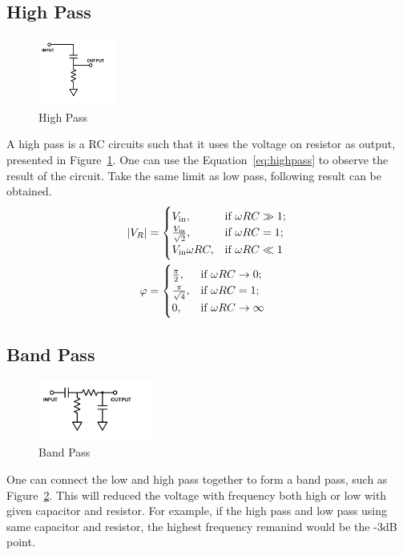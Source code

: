 \documentclass[aps,prl,reprint]{revtex4-1}
\begin{document}
    \subsection{High Pass}
        \begin{figure}[h]
            \centering
            \includegraphics[width=1in]{image/highpass.pdf}
            \caption{High Pass}
            \label{fig:highpass}
        \end{figure}
        A high pass is a RC circuits such that it uses the voltage on resistor as output, presented in Figure~\ref{fig:highpass}. One can use the Equation~\ref{eq:highpass} to observe the result of the circuit. Take the same limit as low pass, following result can be obtained.
        \begin{align*}
            \abs{V_R} &= 
            \begin{cases}
                V_\text{in},                & \text{if } \omega R C \gg 1;\\
                \frac{V_\text{in}}{\sqrt{2}}, & \text{if } \omega R C = 1;\\
                V_\text{in}\omega R C,      & \text{if } \omega R C \ll 1\\
            \end{cases}\\
            \varphi &= 
            \begin{cases}
                \frac{\pi}{2},                & \text{if } \omega R C \rightarrow 0;\\
                \frac{\pi}{\sqrt{4}}, & \text{if } \omega R C = 1;\\
                0,      & \text{if } \omega R C \rightarrow \infty\\
            \end{cases}\\
        \end{align*}
    \subsection{Band Pass}
        \begin{figure}[h]
            \centering
            \includegraphics[width=1.5in]{image/bandpass.pdf}
            \caption{Band Pass}
            \label{fig:bandpass}
        \end{figure}
        One can connect the low and high pass together to form a band pass, such as Figure~\ref{fig:bandpass}. This will reduced the voltage with frequency both high or low with given capacitor and resistor. For example, if the high pass and low pass using same capacitor and resistor, the highest frequency remanind would be the -3dB point.
\end{document}
